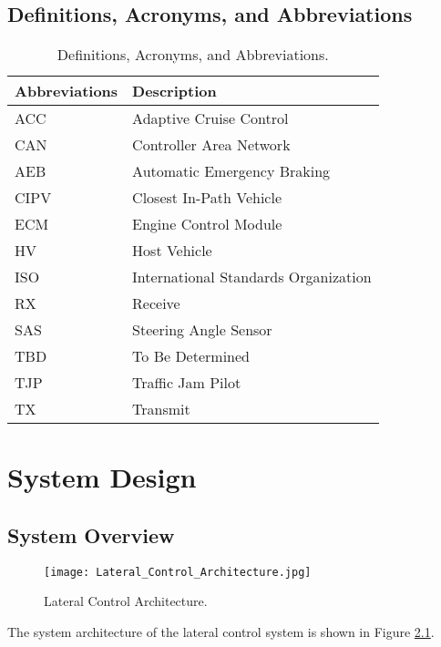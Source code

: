 \documentclass[11pt,letterpaper]{report}
\begin{document}
\section{Definitions, Acronyms, and Abbreviations}
\begin{table}[!htbp]
  \begin{center}
    \caption{Definitions, Acronyms, and Abbreviations.}
    \label{tab:acronyms}
    \begin{tabular}{|p{3cm}|p{10cm}|}
      \hline
      {\bf Abbreviations} & {\bf Description} \\
      \hline
      ACC & Adaptive Cruise Control\\
      \hline
      CAN & Controller Area Network\\
      \hline
      AEB & Automatic Emergency Braking\\
      \hline
      CIPV & Closest In-Path Vehicle \\
      \hline
      ECM & Engine Control Module \\
      \hline
      HV  & Host Vehicle \\
      \hline
      ISO & International Standards Organization\\
      \hline
      RX  & Receive \\
      \hline
      SAS & Steering Angle Sensor \\
      \hline
      TBD & To Be Determined \\
      \hline
      TJP & Traffic Jam Pilot \\
      \hline
      TX  & Transmit \\
      \hline
      
    \end{tabular}
    \end{center}
\end{table}

\chapter{System Design}

\section{System Overview}
\begin{figure}[htbp]
  \centerline{\texttt{[image: Lateral\_Control\_Architecture.jpg]}}
  \caption{Lateral Control Architecture.}
  \label{lateral_control_architecture}
\end{figure}
The system architecture of the lateral control system is shown in Figure
\ref{lateral_control_architecture}.
\end{document}
